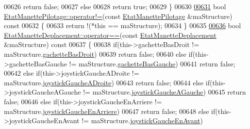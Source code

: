 \begin{DoxyCode}
00626         \textcolor{keywordflow}{return} \textcolor{keyword}{false};
00627     \textcolor{keywordflow}{else}
00628         \textcolor{keywordflow}{return} \textcolor{keyword}{true};
00629 \}
00630 
\hyperlink{struct_etat_manette_pilotage_a1a9cbf7891c30ab2503ec9c9b7fb5299}{00631} \textcolor{keywordtype}{bool} \hyperlink{struct_etat_manette_pilotage_a1a9cbf7891c30ab2503ec9c9b7fb5299}{EtatManettePilotage::operator!=}(\textcolor{keyword}{const} 
      \hyperlink{struct_etat_manette_pilotage}{EtatManettePilotage} &maStructure)\textcolor{keyword}{ const}
00632 \textcolor{keyword}{}\{
00633     \textcolor{keywordflow}{return} !(*\textcolor{keyword}{this} == maStructure);
00634 \}
00635 
\hyperlink{struct_etat_manette_deplacement_a8f248b6ec1788c058e161b74fb371c5b}{00636} \textcolor{keywordtype}{bool} \hyperlink{struct_etat_manette_deplacement_a8f248b6ec1788c058e161b74fb371c5b}{EtatManetteDeplacement::operator==}(\textcolor{keyword}{const} 
      \hyperlink{struct_etat_manette_deplacement}{EtatManetteDeplacement} &maStructure)\textcolor{keyword}{ const}
00637 \textcolor{keyword}{}\{
00638     \textcolor{keywordflow}{if}(this->gachetteBasDroit != maStructure.\hyperlink{struct_etat_manette_deplacement_a4588620c1e2a3543ce67c9a791aac106}{gachetteBasDroit})
00639         \textcolor{keywordflow}{return} \textcolor{keyword}{false};
00640     \textcolor{keywordflow}{else} \textcolor{keywordflow}{if}(this->gachetteBasGauche != maStructure.\hyperlink{struct_etat_manette_deplacement_a0d197e25bc2e0402a068a8d012c25472}{gachetteBasGauche})
00641         \textcolor{keywordflow}{return} \textcolor{keyword}{false};
00642     \textcolor{keywordflow}{else} \textcolor{keywordflow}{if}(this->joystickGaucheADroite != maStructure.\hyperlink{struct_etat_manette_deplacement_a8fa93da5af430ac00ffd4ee8b76987a2}{joystickGaucheADroite})
00643         \textcolor{keywordflow}{return} \textcolor{keyword}{false};
00644     \textcolor{keywordflow}{else} \textcolor{keywordflow}{if}(this->joystickGaucheAGauche != maStructure.\hyperlink{struct_etat_manette_deplacement_af7e92a8d8f116e2bc4a5a95386f604e7}{joystickGaucheAGauche})
00645         \textcolor{keywordflow}{return} \textcolor{keyword}{false};
00646     \textcolor{keywordflow}{else} \textcolor{keywordflow}{if}(this->joystickGaucheEnArriere != maStructure.\hyperlink{struct_etat_manette_deplacement_a584cf1538425c87588c5b96b79c8d482}{joystickGaucheEnArriere})
00647         \textcolor{keywordflow}{return} \textcolor{keyword}{false};
00648     \textcolor{keywordflow}{else} \textcolor{keywordflow}{if}(this->joystickGaucheEnAvant != maStructure.\hyperlink{struct_etat_manette_deplacement_a8c8e3ca694408bc6a6ced4e20b9da0be}{joystickGaucheEnAvant})

\end{DoxyCode}
